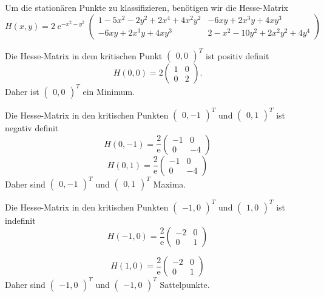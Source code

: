 {Um die stationären Punkte zu klassifizieren, benötigen wir die Hesse-Matrix
$$
H(x,y) = 2 \operatorname{e}^{-x^2-y^2} 
\begin{pmatrix}
1 - 5x^2 - 2y^2 + 2x^4 + 4x^2y^2 & - 6xy + 2x^3y + 4xy^3\\
 - 6 xy + 2x^3y + 4xy^3 & 2 - x^2 - 10y^2 + 2x^2y^2 + 4y^4
\end{pmatrix}
$$

Die Hesse-Matrix in dem kritischen Punkt $\begin{pmatrix} 0,0 \end{pmatrix}^T$ ist
positiv definit
$$
H(0,0) = 
2 \begin{pmatrix}
1 & 0\\
0 & 2
\end{pmatrix}.
$$
Daher ist $\begin{pmatrix} 0,0 \end{pmatrix}^T$ ein Minimum.

Die Hesse-Matrix in den kritischen Punkten $\begin{pmatrix} 0,-1 \end{pmatrix}^T$ und 
$\begin{pmatrix} 0,1 \end{pmatrix}^T$ ist negativ definit
$$
H(0,-1) =
\frac{2}{\operatorname{e}}
\begin{pmatrix}
-1 & 0\\
0 & -4
\end{pmatrix}
$$
$$
H(0,1) =
\frac{2}{\operatorname{e}}
\begin{pmatrix}
-1 & 0\\
0 & -4
\end{pmatrix}
$$
Daher sind $\begin{pmatrix} 0, -1 \end{pmatrix}^T$ und $\begin{pmatrix} 0, 1 \end{pmatrix}^T$ Maxima.

Die Hesse-Matrix in den kritischen Punkten $\begin{pmatrix} -1, 0 \end{pmatrix}^T$ und 
$\begin{pmatrix} 1, 0 \end{pmatrix}^T$ ist indefinit
$$
H(-1,0) =
\frac{2}{\operatorname{e}}
\begin{pmatrix}
-2 & 0\\
0 & 1
\end{pmatrix}
$$

$$
H(1,0) =
\frac{2}{\operatorname{e}}
\begin{pmatrix}
-2 & 0\\
0 & 1
\end{pmatrix}
$$
Daher sind $\begin{pmatrix} -1,0 \end{pmatrix}^T$ und $\begin{pmatrix} -1,0 \end{pmatrix}^T$ 
Sattelpunkte.

}

